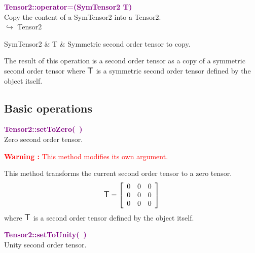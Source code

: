 \textcolor{purple}{\textbf{Tensor2::operator=(SymTensor2 T)}}\label{Tensor2::operator=(SymTensor2 T)}\\
Copy the content of a SymTensor2 into a Tensor2.\\ \hspace*{10mm}$\hookrightarrow$ Tensor2

\begin{tcolorbox}[width=\textwidth,myArgs,tabularx={ll|R}]
SymTensor2 & T & Symmetric second order tensor to copy.
\end{tcolorbox}

The result of this operation is a second order tensor as a copy of a symmetric second order tensor where $\mbox{\large\ensuremath{\mathsf{T}}}$ is a symmetric second order tensor defined by the object itself.

\subsection{Basic operations}

\textcolor{purple}{\textbf{Tensor2::setToZero(~)}}\label{Tensor2::setToZero()}\\
Zero second order tensor.

\hspace*{10mm}\textcolor{red}{\textbf{Warning :} This method modifies its own argument.}

This method transforms the current second order tensor to a zero tensor.
\begin{equation*}
\mbox{\large\ensuremath{\mathsf{T}}}=\left[\begin{array}{ccc}
0 & 0 & 0\\
0 & 0 & 0\\
0 & 0 & 0
\end{array}\right]
\end{equation*}
where $\mbox{\large\ensuremath{\mathsf{T}}}$ is a second order tensor defined by the object itself.

\textcolor{purple}{\textbf{Tensor2::setToUnity(~)}}\label{Tensor2::setToUnity()}\\
Unity second order tensor.

